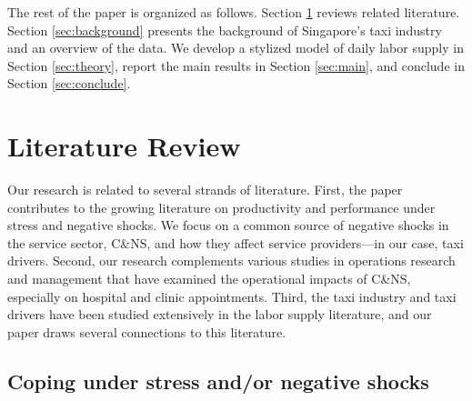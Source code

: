 \documentclass[reviewmode,AEJ]{AEA}
\begin{document}
The rest of the paper is organized as follows. Section \ref{sec:literature} reviews related literature. 
Section \ref{sec:background} presents the background of Singapore's taxi industry and an overview of the data. 
We develop a stylized model of daily labor supply in Section \ref{sec:theory}, 
report the main results in Section \ref{sec:main}, and conclude in Section \ref{sec:conclude}.

\section{Literature Review}
\label{sec:literature}

Our research is related to several strands of literature. First, the paper contributes to the growing 
literature on productivity and performance under stress and negative shocks. We focus on a common 
source of negative shocks in the service sector, C\&NS, and how they affect service providers---in our
case, taxi drivers. Second, our research complements various studies in operations research and 
management that have examined the operational impacts of C\&NS, especially on hospital and clinic 
appointments. Third, the taxi industry and taxi drivers  have been studied extensively in the labor
supply literature, and our paper draws several connections to this literature.  


\subsection{Coping under stress and/or negative shocks}
\end{document}
